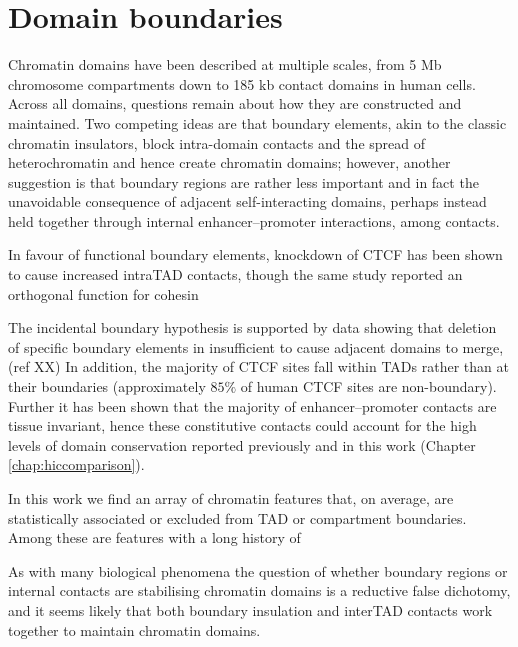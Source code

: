 \documentclass[a4paper,11pt,oneside]{book}
\begin{document}
\section{Domain boundaries}

Chromatin domains have been described at multiple scales, from 5 Mb chromosome compartments\cite{Lieberman2009} down to 185 kb contact domains\cite{Rao2014} in human cells. Across all domains, questions remain about how they are constructed and maintained. Two competing ideas are that boundary elements, akin to the classic chromatin insulators, block intra-domain contacts and the spread of heterochromatin and hence create chromatin domains; however, another suggestion is that boundary regions are rather less important and in fact the unavoidable consequence of adjacent self-interacting domains, perhaps instead held together through internal enhancer--promoter interactions, among contacts.  

In favour of functional boundary elements, knockdown of CTCF has been shown to cause increased intraTAD contacts,\cite{Zuin2013} though the same study reported an orthogonal function for cohesin

The incidental boundary hypothesis is supported by data showing that deletion of specific boundary elements in insufficient to cause adjacent domains to merge,(ref XX) In addition, the majority of CTCF sites fall within TADs rather than at their boundaries (approximately $85\%$ of human CTCF sites are non-boundary\cite{Dixon2012}). Further it has been shown that the majority of enhancer--promoter contacts are tissue invariant,\cite{Bouwman2015a} hence these constitutive contacts could account for the high levels of domain conservation reported previously\cite{Lieberman2009, Dixon2012, Chambers2013, Rao2014} and in this work (Chapter \ref{chap:hiccomparison}).

In this work we find an array of chromatin features that, on average, are statistically associated or excluded from TAD or compartment boundaries. Among these are features with a long history of 


As with many biological phenomena the question of whether boundary regions or internal contacts are stabilising chromatin domains is a reductive false dichotomy, and it seems likely that both boundary insulation and interTAD contacts work together to maintain chromatin domains.
\end{document}

